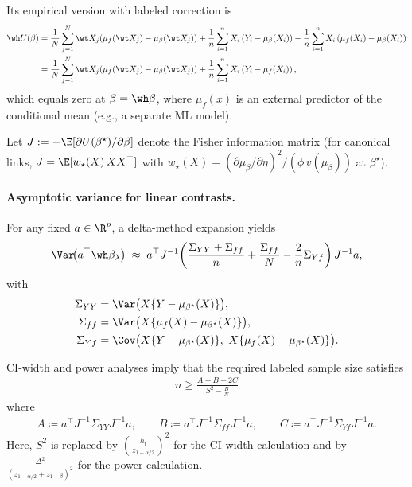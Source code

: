 \noindent
Its empirical version with labeled correction is \begin{align}
    \wh U(\beta)&=\frac{1}{N}\sum^N_{j=1}\wt X_j(\mu_f(\wt X_j)-\mu_\beta(\wt X_j))
    +\frac{1}{n}\sum^n_{i=1}X_i\left(Y_i-\mu_\beta(X_i)\right)
    -\frac{1}{n}\sum^n_{i=1}X_i\left(\mu_f(X_i)-\mu_\beta(X_i)\right)\notag\\
    &=\frac{1}{N}\sum^N_{j=1}\wt X_j(\mu_f(\wt X_j)-\mu_\beta(\wt X_j))
    +\frac{1}{n}\sum^n_{i=1}X_i\left(Y_i-\mu_f(X_i)\right)\label{eq:emp-canonical-score},
\end{align}which equals zero at $\beta=\wh\beta$, where $\mu_f(x)$ is an external predictor of the conditional mean (e.g., a separate ML model).

\noindent
Let $J:= -\E[\partial U(\beta^\star)/\partial\beta]$ denote the Fisher information matrix (for canonical links, $J=\E[w_\star(X)\,XX^\top]$ with $w_\star(X)=(\partial\mu_\beta/\partial\eta)^2/(\phi\,v(\mu_\beta))$ at $\beta^\star$). 

\paragraph{Asymptotic variance for linear contrasts.}
For any fixed $a\in\R^p$, a delta-method expansion yields\begin{equation}\label{eq:ppi-glm-var}
\Var\!\big(a^\top\wh\beta_\lambda\big)
\;\approx\;
a^\top J^{-1}\!\left(
\frac{\Sigma_{YY}+\Sigma_{ff}}{n}
+\frac{\Sigma_{ff}}{N}
-\frac{2}{n}\Sigma_{Yf}
\right)J^{-1}a,
\end{equation}
with
\[
\begin{aligned}
\Sigma_{YY} &= \Var\big(X\{Y - \mu_{\beta^\star}(X)\}\big), \\
\Sigma_{ff} &= \Var\big(X\{\mu_f(X) - \mu_{\beta^\star}(X)\}\big), \\
\Sigma_{Yf} &= \Cov\big(X\{Y - \mu_{\beta^\star}(X)\},\ 
                      X\{\mu_f(X) - \mu_{\beta^\star}(X)\}\big).
\end{aligned}
\]

\noindent
CI-width and power analyses imply that the required labeled sample size satisfies\begin{align}
\label{eq:n-for-glm-ppi}
     n\geq \frac{A+B-2C}{S^2-\frac{B}{N}}
\end{align}where
\begin{align*}
A\coloneqq a^\top J^{-1}\Sigma_{YY}J^{-1}a,\qquad
B\coloneqq a^\top J^{-1}\Sigma_{ff}J^{-1}a,\qquad 
C\coloneqq a^\top J^{-1}\Sigma_{Yf}J^{-1}a.\end{align*}Here, $S^2$ is replaced by $\left(\frac{h_t}{z_{1-\alpha/2}}\right)^2$ for the CI-width calculation and by $\frac{\Delta^2}{(z_{1-\alpha/2}+z_{1-\beta})^2}$ for the power calculation.

